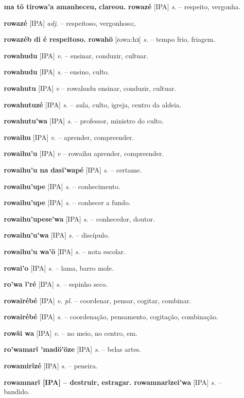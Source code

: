 \textbf{ma tô tirowa'a amanheceu, clareou. rowazé} [IPA] \textit{s.} -- respeito, vergonha.

\textbf{rowazé} [IPA] \textit{adj.} -- respeitoso, vergonhoso;.

\textbf{rowazéb di é respeitoso. rowahö} [ɾowa:hɜ] \textit{s.} -- tempo frio, friagem.

\textbf{rowahudu} [IPA] \textit{v.} -- ensinar, conduzir, cultuar.

\textbf{rowahudu} [IPA] \textit{s.} -- ensino, culto.

\textbf{rowahutu} [IPA] \textit{v} -- rowahudu ensinar, conduzir, cultuar.

\textbf{rowahutuzé} [IPA] \textit{s.} -- aula, culto, igreja, centro da aldeia.

\textbf{rowahutu'wa} [IPA] \textit{s.} -- professor, ministro do culto.

\textbf{rowaihu} [IPA] \textit{v.} -- aprender, compreender.

\textbf{rowaihu'u} [IPA] \textit{v} -- rowaihu aprender, compreender.

\textbf{rowaihu'u na dasi'wapé} [IPA] \textit{s.} -- certame.

\textbf{rowaihu'upe} [IPA] \textit{s.} -- conhecimento.

\textbf{rowaihu'upe} [IPA] \textit{s.} -- conhecer a fundo.

\textbf{rowaihu'upese'wa} [IPA] \textit{s.} -- conhecedor, doutor.

\textbf{rowaihu'u'wa} [IPA] \textit{s.} -- discípulo.

\textbf{rowaihu'u wa'ö} [IPA] \textit{s.} -- nota escolar.

\textbf{rowai'o} [IPA] \textit{s.} -- lama, barro mole.

\textbf{ro'wa ĩ'ré} [IPA] \textit{s.} -- espinho seco.

\textbf{rowairébé} [IPA] \textit{v. pl.} -- coordenar, pensar, cogitar, combinar.

\textbf{rowairébé} [IPA] \textit{s.} -- coordenação, pensamento, cogitação, combinação.

\textbf{rowãi wa} [IPA] \textit{v.} -- no meio, no centro, em.

\textbf{ro'wamarĩ 'madö'öze} [IPA] \textit{s.} -- belas artes.

\textbf{rowamirĩzé} [IPA] \textit{s.} -- peneira.

\textbf{rowamnarĩ [IPA]  -- destruir, estragar. rowamnarĩzei'wa} [IPA] \textit{s.} -- bandido.

